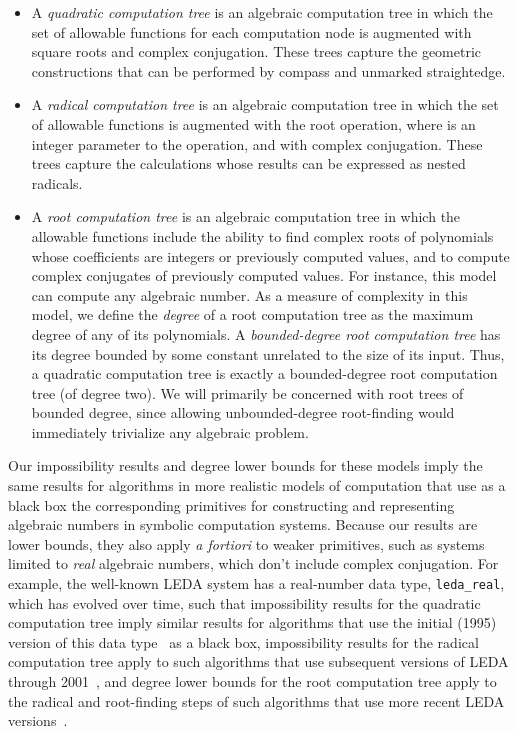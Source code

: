 \documentclass[oribibl,10pt]{llncs}
\newcommand{\nth}[1]{}
\begin{document}
\begin{itemize}
\item 
A \emph{quadratic computation tree} is an algebraic computation tree in which the set of allowable functions for each computation node is augmented with square roots and complex conjugation. These trees capture the geometric constructions that can be performed by compass and unmarked straightedge.
\item 
A \emph{radical computation tree} is an algebraic computation tree in which the 
set of allowable functions is augmented with the \nth{k} root operation, 
where  is an integer parameter to the operation, and with complex conjugation. These trees capture the calculations whose results can be expressed as nested radicals.
\item 
A \emph{root computation tree} is an algebraic computation tree in which the allowable functions include the ability to find complex roots of polynomials whose coefficients are integers or previously computed values, and to compute complex conjugates of previously computed values. 
For instance, this model can compute any algebraic number.
As a measure of complexity in this model, we define
the \emph{degree} of a root computation tree as the maximum degree of any of its polynomials.
A \emph{bounded-degree root computation tree}
has its degree bounded by some constant unrelated to the size of its input.
Thus, a quadratic computation tree is exactly a 
bounded-degree root computation tree (of degree two).
\ifFull
We will primarily be concerned with root trees of bounded degree, since allowing unbounded-degree root-finding would immediately trivialize any algebraic problem.
\fi
\end{itemize}
Our impossibility results and degree lower bounds for these models 
imply the same 
results for algorithms in more realistic models of computation that use as a black box the corresponding primitives 
for constructing and representing algebraic numbers in
symbolic computation systems.
Because our results are lower bounds, they also apply \textit{a fortiori} to weaker primitives, such as systems limited to \emph{real} algebraic numbers, which
don't include complex conjugation.
\ifFull
For example, the well-known LEDA system has a real-number 
data type, \texttt{leda\_real}, which has evolved over time,
such that impossibility results for the quadratic computation tree 
imply similar results for algorithms that use the initial (1995) version 
of this data type~\cite{Burnikel:1995} as a black box,
impossibility results for the radical computation tree apply to such
algorithms that use subsequent
versions of LEDA through 2001~\cite{MehSch-SAMVM-01}, and degree lower bounds
for the root computation tree apply to 
the radical and root-finding steps 
of such algorithms that use more recent LEDA versions~\cite{s-doie-05}.
\fi
\end{document}
